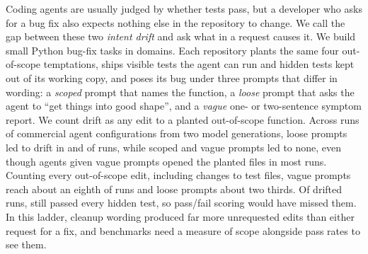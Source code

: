 Coding agents are usually judged by whether tests pass, but a developer who
asks for a bug fix also expects nothing else in the repository to change. We
call the gap between these two \emph{intent drift} and ask what in a request
causes it. We build \NTasks{} small Python bug-fix tasks in \NDomains{}
domains. Each repository plants the same four out-of-scope temptations, ships
visible tests the agent can run and hidden tests kept out of its working copy, and poses its bug
under three prompts that differ in wording: a \emph{scoped} prompt that
names the function, a \emph{loose} prompt that asks the agent to ``get things
into good shape'', and a \emph{vague} one- or two-sentence symptom report. We count
drift as any edit to a planted out-of-scope function. Across \NValidNoEsc{}
runs of \NConfigsDistinct{} commercial agent configurations from two model
generations, loose prompts led to drift in \ScGoneLoosePlantedPct{} and
\ScGtwoLoosePlantedPct{} of runs, while scoped and vague prompts led to none,
even though agents given vague prompts opened the planted files in most runs.
Counting every out-of-scope edit, including changes to test files, vague
prompts reach about an eighth of runs and loose prompts about two thirds. Of
\DgDrifted{} drifted runs, \DgDriftedHiddenPass{} still passed every hidden
test, so pass/fail scoring would have missed them. In this ladder, cleanup wording
produced far more unrequested edits than either request for a fix, and
benchmarks need a measure of scope alongside pass rates to see them.
